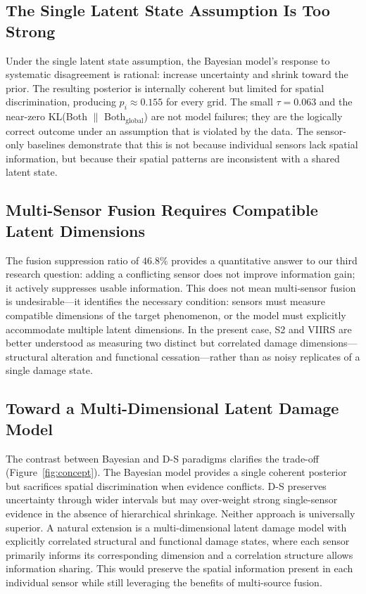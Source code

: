 \documentclass[wcp]{jmlr}
\begin{document}
\subsection{The Single Latent State Assumption Is Too Strong}

Under the single latent state assumption, the Bayesian model's response to
systematic disagreement is rational: increase uncertainty and shrink toward
the prior. The resulting posterior is internally coherent but limited for
spatial discrimination, producing $p_i \approx 0.155$ for every grid. The
small $\tau=0.063$ and the near-zero KL(Both $\|$ Both$_{\text{global}}$)
are not model failures; they are the logically correct outcome under an
assumption that is violated by the data. The sensor-only baselines
demonstrate that this is not because individual sensors lack spatial
information, but because their spatial patterns are inconsistent with a
shared latent state.

\subsection{Multi-Sensor Fusion Requires Compatible Latent Dimensions}

The fusion suppression ratio of $46.8\%$ provides a quantitative answer to
our third research question: adding a conflicting sensor does not improve
information gain; it actively suppresses usable information. This does not
mean multi-sensor fusion is undesirable---it identifies the necessary
condition: sensors must measure compatible dimensions of the target
phenomenon, or the model must explicitly accommodate multiple latent
dimensions. In the present case, S2 and VIIRS are better understood as
measuring two distinct but correlated damage dimensions---structural
alteration and functional cessation---rather than as noisy replicates of a
single damage state.

\subsection{Toward a Multi-Dimensional Latent Damage Model}

The contrast between Bayesian and D-S paradigms clarifies the trade-off
(Figure~\ref{fig:concept}). The Bayesian model provides a single coherent
posterior but sacrifices spatial discrimination when evidence conflicts.
D-S preserves uncertainty through wider intervals but may over-weight
strong single-sensor evidence in the absence of hierarchical shrinkage.
Neither approach is universally superior. A natural extension is a
multi-dimensional latent damage model with explicitly correlated structural
and functional damage states, where each sensor primarily informs its
corresponding dimension and a correlation structure allows information
sharing. This would preserve the spatial information present in each
individual sensor while still leveraging the benefits of multi-source
fusion.
\end{document}
